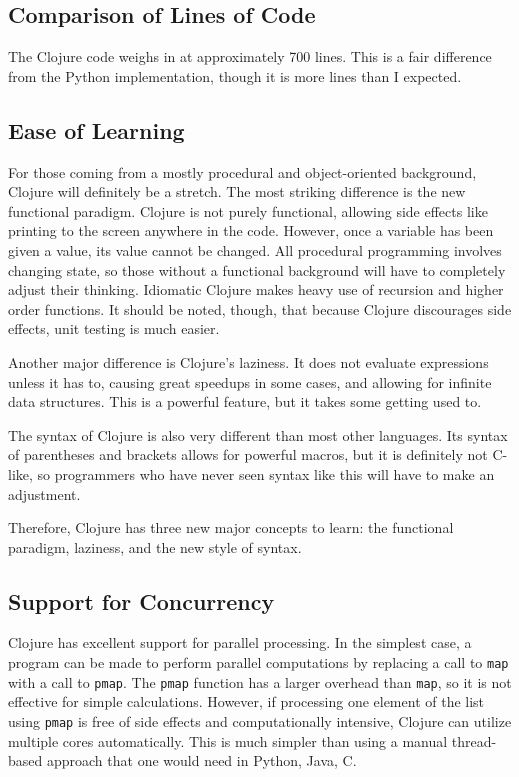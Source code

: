 \documentclass{article}
\begin{document}
\subsection{Comparison of Lines of Code}

The Clojure code weighs in at approximately 700 lines.  This is a fair
difference from the Python implementation, though it is more lines than I
expected.

\subsection{Ease of Learning}

For those coming from a mostly procedural and object-oriented background,
Clojure will definitely be a stretch.  The most striking difference is the new
functional paradigm.  Clojure is not purely functional, allowing side effects
like printing to the screen anywhere in the code.  However, once a variable has
been given a value, its value cannot be changed.  All procedural programming
involves changing state, so those without a functional background will have to
completely adjust their thinking.  Idiomatic Clojure makes heavy use of
recursion and higher order functions.  It should be noted, though, that because
Clojure discourages side effects, unit testing is much easier.

Another major difference is Clojure's laziness.  It does not evaluate
expressions unless it has to, causing great speedups in some cases, and allowing
for infinite data structures.  This is a powerful feature, but it takes some
getting used to.  

The syntax of Clojure is also very different than most other languages.  Its
syntax of parentheses and brackets allows for powerful macros, but it is
definitely not C-like, so programmers who have never seen syntax like this will
have to make an adjustment.

Therefore, Clojure has three new major concepts to learn: the functional
paradigm, laziness, and the new style of syntax.

\subsection{Support for Concurrency}

Clojure has excellent support for parallel processing.  In the simplest case, a
program can be made to perform parallel computations by replacing a call to
\texttt{map} with a call to \texttt{pmap}.  The \texttt{pmap} function has a
larger overhead than \texttt{map}, so it is not effective for simple
calculations.  However, if processing one element of the list using
\texttt{pmap} is free of side effects and computationally intensive, Clojure can
utilize multiple cores automatically.  This is much simpler than using a manual
thread-based approach that one would need in Python, Java, C.
\end{document}
